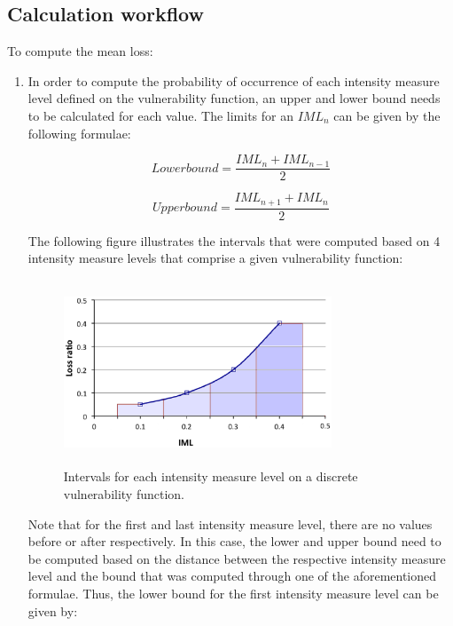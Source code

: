 \subsection{Calculation workflow}

To compute the mean loss:

\begin{enumerate}
\item In order to compute the probability of occurrence of each intensity measure level defined on the vulnerability function, an upper and lower bound needs to be calculated for each value. The limits for an $IML_n$ can be given by the following formulae:

\begin{equation}
Lower bound = \frac{IML_n+IML_{n-1}}{2}
\end{equation}

\begin{equation}
Upper bound = \frac{IML_{n+1}+IML_{n}}{2}
\end{equation}

The following figure illustrates the intervals that were computed based on 4 intensity measure levels that comprise a given vulnerability function:

\begin{figure}[ht]
\centering
\includegraphics[width=8cm,height=5.5cm]{./Figures/Part_Risk/VF_intervals.eps}
\caption{Intervals for each intensity measure level on a discrete vulnerability function.}
\label{fig:VF_intervals}
\end{figure}

Note that for the first and last intensity measure level, there are no values before or after respectively. In this case, the lower and upper bound need to be computed based on the distance between the respective intensity measure level and the bound that was computed through one of the aforementioned formulae. Thus, the lower bound for the first intensity measure level can be given by:


\end{enumerate}
